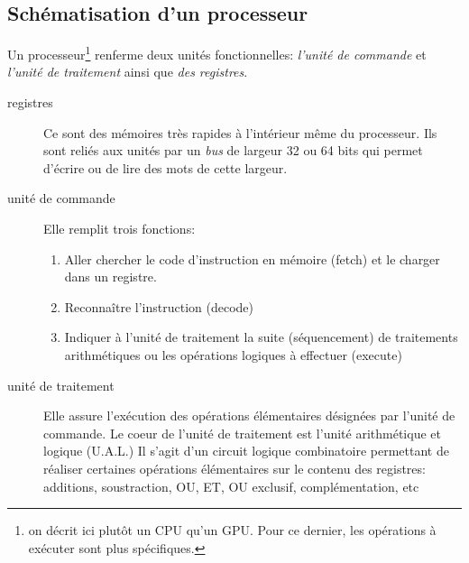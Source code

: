\subsection{Schématisation d'un processeur}
Un processeur\footnote{on décrit ici plutôt un CPU qu'un GPU. Pour ce dernier, les opérations à exécuter sont plus spécifiques.} renferme deux unités fonctionnelles: \emph{l'unité de commande} et \emph{l'unité de traitement} ainsi que \emph{des registres}.
\begin{description}
 \item[registres] Ce sont des mémoires très rapides à l'intérieur même du processeur. Ils sont reliés aux unités par un \emph{bus} de largeur 32 ou 64 bits qui permet d'écrire ou de lire des mots de cette largeur.
 \item[unité de commande] Elle remplit trois fonctions:
 \begin{enumerate}
  \item Aller chercher le code d'instruction en mémoire (fetch) et le charger dans un registre.
  \item Reconnaître l'instruction (decode)
  \item Indiquer à l'unité de traitement la suite (séquencement) de traitements arithmétiques ou les opérations logiques à effectuer (execute) 
 \end{enumerate}
 \item[unité de traitement] Elle assure l'exécution des opérations élémentaires désignées par l'unité de commande. Le coeur de l'unité de traitement est l'unité arithmétique et logique (U.A.L.) Il s'agit d'un circuit logique combinatoire permettant de réaliser certaines opérations élémentaires sur le contenu des registres: additions, soustraction, OU, ET, OU exclusif, complémentation, etc 
\end{description}

